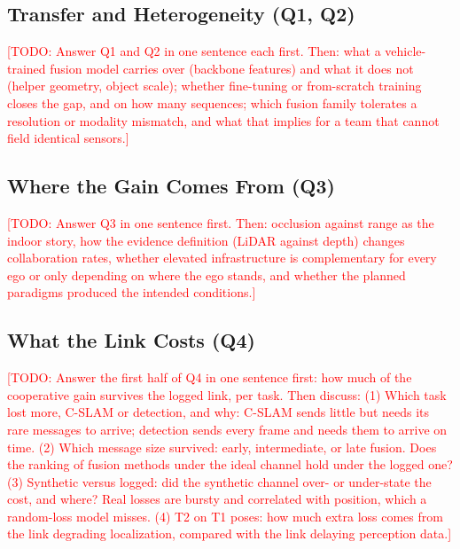 \documentclass[journal]{IEEEtran}
\newcommand{\todo}[1]{\textcolor{red}{[TODO: #1]}}
\begin{document}
\subsection{Transfer and Heterogeneity (Q1, Q2)}
\todo{Answer Q1 and Q2 in one sentence each first. Then: what a
vehicle-trained fusion model carries over (backbone features) and what
it does not (helper geometry, object scale); whether fine-tuning or
from-scratch training closes the gap, and on how many sequences;
which fusion family tolerates a resolution or modality mismatch, and
what that implies for a team that cannot field identical sensors.}

\subsection{Where the Gain Comes From (Q3)}
\todo{Answer Q3 in one sentence first. Then: occlusion against range
as the indoor story, how the evidence definition (LiDAR against depth)
changes collaboration rates, whether elevated infrastructure is
complementary for every ego or only depending on where the ego stands,
and whether the planned paradigms produced the intended conditions.}

\subsection{What the Link Costs (Q4)}
\label{sec:findings}
\todo{Answer the first half of Q4 in one sentence first: how much of the cooperative
gain survives the logged link, per task.
Then discuss:
(1) Which task lost more, C-SLAM or detection, and why: C-SLAM sends
    little but needs its rare messages to arrive; detection sends every
    frame and needs them to arrive on time.
(2) Which message size survived: early, intermediate, or late fusion.
    Does the ranking of fusion methods under the ideal channel hold
    under the logged one?
(3) Synthetic versus logged: did the synthetic channel over- or
    under-state the cost, and where? Real losses are bursty and
    correlated with position, which a random-loss model misses.
(4) T2 on T1 poses: how much extra loss comes from the link degrading
    localization, compared with the link delaying perception data.}
\end{document}

